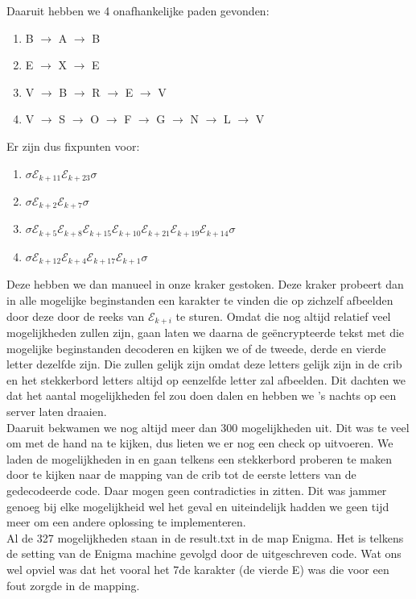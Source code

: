 \documentclass{article}
\begin{document}
	Daaruit hebben we 4 onafhankelijke paden gevonden:
	\begin{enumerate}
		\item B $\rightarrow$ A $\rightarrow$ B
		\item E $\rightarrow$ X $\rightarrow$ E
		\item V $\rightarrow$ B $\rightarrow$ R $\rightarrow$ E $\rightarrow$ V
		\item V $\rightarrow$ S $\rightarrow$ O $\rightarrow$ F $\rightarrow$ G $\rightarrow$ N $\rightarrow$ L $\rightarrow$ V
	\end{enumerate}

	Er zijn dus fixpunten voor:
	\begin{enumerate}
		\item $\sigma \mathcal{E}_{k+11} \mathcal{E}_{k+23} \sigma$
		\item $\sigma \mathcal{E}_{k+2} \mathcal{E}_{k+7} \sigma$
		\item $\sigma \mathcal{E}_{k+5} \mathcal{E}_{k+8} \mathcal{E}_{k+15} \mathcal{E}_{k+10} \mathcal{E}_{k+21} \mathcal{E}_{k+19} \mathcal{E}_{k+14}\sigma$
		\item $\sigma \mathcal{E}_{k+12} \mathcal{E}_{k+4} \mathcal{E}_{k+17} \mathcal{E}_{k+1} \sigma$
	\end{enumerate}

	Deze hebben we dan manueel in onze kraker gestoken. Deze kraker probeert dan in alle mogelijke beginstanden een karakter te vinden die op zichzelf afbeelden door deze door de reeks van $\mathcal{E}_{k+i}$ te sturen. Omdat die nog altijd relatief veel mogelijkheden zullen zijn, gaan laten we daarna de ge\"{e}ncrypteerde tekst met die mogelijke beginstanden decoderen en kijken we of de tweede, derde en vierde letter dezelfde zijn. Die zullen gelijk zijn omdat deze letters gelijk zijn in de crib en het stekkerbord letters altijd op eenzelfde letter zal afbeelden. Dit dachten we dat het aantal mogelijkheden fel zou doen dalen en hebben we 's nachts op een server laten draaien.\\
	Daaruit bekwamen we nog altijd meer dan 300 mogelijkheden uit. Dit was te veel om met de hand na te kijken, dus lieten we er nog een check op uitvoeren.
	We laden de mogelijkheden in en gaan telkens een stekkerbord proberen te maken door te kijken naar de mapping van de crib tot de eerste letters van de gedecodeerde code. Daar mogen geen contradicties in zitten. Dit was jammer genoeg bij elke mogelijkheid wel het geval en uiteindelijk hadden we geen tijd meer om een andere oplossing te implementeren.
	\\
	Al de 327 mogelijkheden staan in de result.txt in de map Enigma. Het is telkens de setting van de Enigma machine gevolgd door de uitgeschreven code. Wat ons wel opviel was dat het vooral het 7de karakter (de vierde E) was die voor een fout zorgde in de mapping.
	
	
\end{document}
